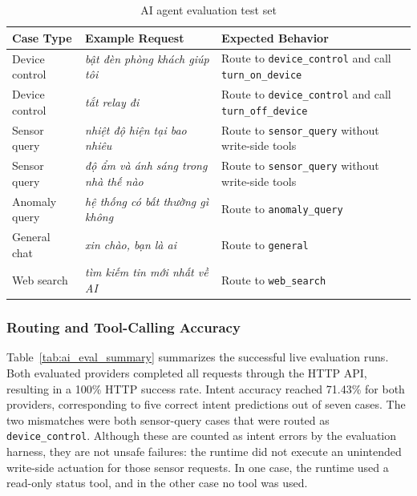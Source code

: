 \begin{table}[H]
\centering
\caption{AI agent evaluation test set}
\label{tab:ai_eval_cases}
\small
\renewcommand{\arraystretch}{1.12}
\begin{tabularx}{\textwidth}{p{3.1cm}X p{3.2cm}}
\toprule
\textbf{Case Type} & \textbf{Example Request} & \textbf{Expected Behavior} \\
\midrule
Device control & \textit{bật đèn phòng khách giúp tôi} & Route to \texttt{device\_control} and call \texttt{turn\_on\_device} \\
Device control & \textit{tắt relay đi} & Route to \texttt{device\_control} and call \texttt{turn\_off\_device} \\
Sensor query & \textit{nhiệt độ hiện tại bao nhiêu} & Route to \texttt{sensor\_query} without write-side tools \\
Sensor query & \textit{độ ẩm và ánh sáng trong nhà thế nào} & Route to \texttt{sensor\_query} without write-side tools \\
Anomaly query & \textit{hệ thống có bất thường gì không} & Route to \texttt{anomaly\_query} \\
General chat & \textit{xin chào, bạn là ai} & Route to \texttt{general} \\
Web search & \textit{tìm kiếm tin mới nhất về AI} & Route to \texttt{web\_search} \\
\bottomrule
\end{tabularx}
\end{table}

\subsubsection{Routing and Tool-Calling Accuracy}

Table~\ref{tab:ai_eval_summary} summarizes the successful live evaluation runs. Both evaluated providers completed all requests through the HTTP API, resulting in a 100\% HTTP success rate. Intent accuracy reached 71.43\% for both providers, corresponding to five correct intent predictions out of seven cases. The two mismatches were both sensor-query cases that were routed as \texttt{device\_control}. Although these are counted as intent errors by the evaluation harness, they are not unsafe failures: the runtime did not execute an unintended write-side actuation for those sensor requests. In one case, the runtime used a read-only status tool, and in the other case no tool was used. \\

